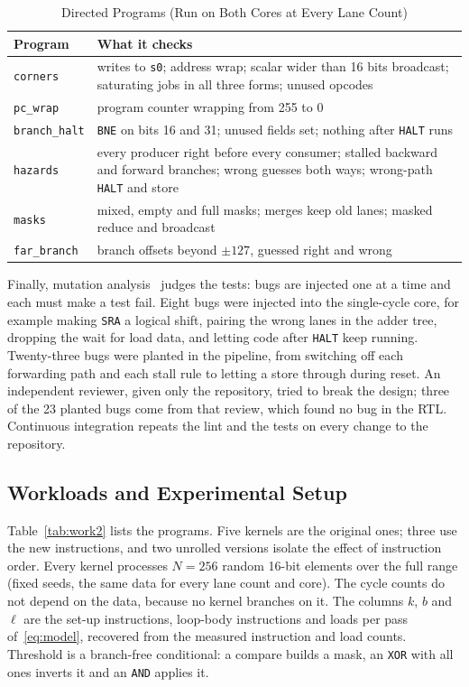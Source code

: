 \begin{table}[t]
\centering
\caption{Directed Programs (Run on Both Cores at Every Lane Count)}
\label{tab:directed}
\footnotesize
\begin{tabular}{@{}lL{6.2cm}@{}}
\toprule
Program & What it checks \\
\midrule
\texttt{corners} & writes to \texttt{s0}; address wrap; scalar wider than 16 bits broadcast; saturating jobs in all three forms; unused opcodes \\
\texttt{pc\_wrap} & program counter wrapping from 255 to 0 \\
\texttt{branch\_halt} & \texttt{BNE} on bits 16 and 31; unused fields set; nothing after \texttt{HALT} runs \\
\texttt{hazards} & every producer right before every consumer; stalled backward and forward branches; wrong guesses both ways; wrong-path \texttt{HALT} and store \\
\texttt{masks} & mixed, empty and full masks; merges keep old lanes; masked reduce and broadcast \\
\texttt{far\_branch} & branch offsets beyond $\pm127$, guessed right and wrong \\
\bottomrule
\end{tabular}
\end{table}

Finally, mutation analysis~\cite{demillo} judges the tests: bugs are injected one at a
time and each must make a test fail. Eight bugs were injected into the single-cycle
core, for example making \texttt{SRA} a logical shift, pairing the wrong lanes in the
adder tree, dropping the wait for load data, and letting code after \texttt{HALT} keep
running. Twenty-three bugs were planted in the pipeline, from switching off each
forwarding path and each stall rule to letting a store through during reset. An
independent reviewer, given only the repository, tried to break the design; three of the
23 planted bugs come from that review, which found no bug in the RTL. Continuous
integration repeats the lint and the tests on every change to the repository.

\subsection{Workloads and Experimental Setup}\label{sec:setup}
Table~\ref{tab:work2} lists the programs. Five kernels are the original ones; three use
the new instructions, and two unrolled versions isolate the effect of instruction order.
Every kernel processes $N = 256$ random 16-bit elements over the full range (fixed
seeds, the same data for every lane count and core). The cycle counts do not depend on the
data, because no kernel branches on it. The columns $k$, $b$ and $\ell$ are the
set-up instructions, loop-body instructions and loads per pass of~\eqref{eq:model},
recovered from the measured instruction and load counts. Threshold is a branch-free
conditional: a compare builds a mask, an \texttt{XOR} with all ones inverts it and an
\texttt{AND} applies it.

